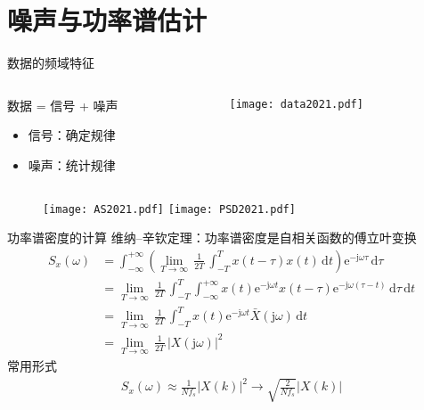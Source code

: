 \documentclass[UTF8]{ctexbeamer}
\begin{document}
\section{噪声与功率谱估计}



\begin{frame}{数据的频域特征}
    \ %

    \begin{columns}
        \begin{column}{0.4\textwidth}
            数据 = 信号 + 噪声
            \begin{itemize}
                \item 信号：确定规律
                \item 噪声：统计规律
            \end{itemize}
        \end{column}
        \begin{column}{0.5\textwidth}
            \centering
            \texttt{[image: data2021.pdf]}
        \end{column}
    \end{columns}
    \begin{figure}
        \centering
        \texttt{[image: AS2021.pdf]} 
        \hspace{10pt}
        \texttt{[image: PSD2021.pdf]} 
    \end{figure}
\end{frame}


\begin{frame}{功率谱密度的计算}
    维纳--辛钦定理：功率谱密度是自相关函数的傅立叶变换
    \begin{align*}
        S_x(\omega) &= \int_{-\infty}^{+\infty} \left( \lim_{T \to \infty} \, \frac{1}{2T} \, \int_{-T}^{T} x(t-\tau)x(t) \,\mathrm{d} t   \right) \mathrm{e}^{-\mathrm{j}\omega\tau} \,\mathrm{d} \tau  \\
        &= \lim_{T \to \infty} \, \frac{1}{2T} \, \int_{-T}^{T} \int_{-\infty}^{+\infty} x(t)\mathrm{e}^{-\mathrm{j} \omega t} x(t-\tau)\mathrm{e}^{-\mathrm{j}\omega(\tau-t)} \,\mathrm{d} \tau \,\mathrm{d} t \\
        &= \lim_{T \to \infty} \, \frac{1}{2T} \, \int_{-T}^{T}  x(t)\mathrm{e}^{-\mathrm{j} \omega t} \bar{X}(\mathrm{j}\omega) \,\mathrm{d} t \\
        &= \lim_{T \to \infty} \, \frac{1}{2T} \, \left| X(\mathrm{j}\omega) \right|^2
    \end{align*}
    常用形式
    \begin{gather*}
        S_x(\omega) \approx  \frac{1}{Nf_s} \left| X(k) \right|^2
        \rightarrow \sqrt{\frac{2}{Nf_s}} \left| X(k) \right|
    \end{gather*}
\end{frame}
\end{document}
